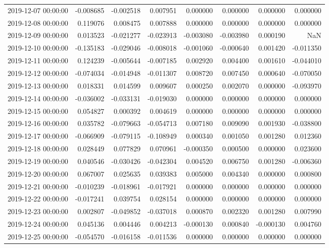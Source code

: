 \begin{tabular}{lrrrrrrr}
2019-12-07 00:00:00 & -0.008685 & -0.002518 & 0.007951 & 0.000000 & 0.000000 & 0.000000 & 0.000000 \\
2019-12-08 00:00:00 & 0.119076 & 0.008475 & 0.007888 & 0.000000 & 0.000000 & 0.000000 & 0.000000 \\
2019-12-09 00:00:00 & 0.013523 & -0.021277 & -0.023913 & -0.003080 & -0.003980 & 0.000190 & NaN \\
2019-12-10 00:00:00 & -0.135183 & -0.029046 & -0.008018 & -0.001060 & -0.000640 & 0.001420 & -0.011350 \\
2019-12-11 00:00:00 & 0.124239 & -0.005644 & -0.007185 & 0.002920 & 0.004400 & 0.001610 & -0.044010 \\
2019-12-12 00:00:00 & -0.074034 & -0.014948 & -0.011307 & 0.008720 & 0.007450 & 0.000640 & -0.070050 \\
2019-12-13 00:00:00 & 0.018331 & 0.014599 & 0.009607 & 0.000250 & 0.002070 & 0.000000 & -0.093970 \\
2019-12-14 00:00:00 & -0.036002 & -0.033131 & -0.019030 & 0.000000 & 0.000000 & 0.000000 & 0.000000 \\
2019-12-15 00:00:00 & 0.054827 & 0.000392 & 0.004619 & 0.000000 & 0.000000 & 0.000000 & 0.000000 \\
2019-12-16 00:00:00 & 0.035782 & -0.079663 & -0.054713 & 0.007180 & 0.009090 & 0.001930 & -0.038800 \\
2019-12-17 00:00:00 & -0.066909 & -0.079115 & -0.108949 & 0.000340 & 0.001050 & 0.001280 & 0.012360 \\
2019-12-18 00:00:00 & 0.028449 & 0.077829 & 0.070961 & -0.000350 & 0.000500 & 0.000000 & 0.023600 \\
2019-12-19 00:00:00 & 0.040546 & -0.030426 & -0.042304 & 0.004520 & 0.006750 & 0.001280 & -0.006360 \\
2019-12-20 00:00:00 & 0.067007 & 0.025635 & 0.039383 & 0.005000 & 0.004340 & 0.000000 & 0.000800 \\
2019-12-21 00:00:00 & -0.010239 & -0.018961 & -0.017921 & 0.000000 & 0.000000 & 0.000000 & 0.000000 \\
2019-12-22 00:00:00 & -0.017241 & 0.039754 & 0.028154 & 0.000000 & 0.000000 & 0.000000 & 0.000000 \\
2019-12-23 00:00:00 & 0.002807 & -0.049852 & -0.037018 & 0.000870 & 0.002320 & 0.001280 & 0.007990 \\
2019-12-24 00:00:00 & 0.045136 & 0.004446 & 0.004213 & -0.000130 & 0.000840 & -0.000130 & 0.004760 \\
2019-12-25 00:00:00 & -0.054570 & -0.016158 & -0.011536 & 0.000000 & 0.000000 & 0.000000 & 0.000000 \\

\end{tabular}
